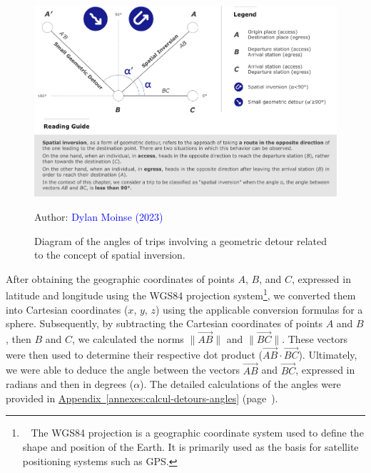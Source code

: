 \begin{refsegment}
\begin{figure}[h!]\vspace*{4pt}
    \caption{Diagram of the angles of trips involving a geometric detour related to the concept of spatial inversion.}
    \label{fig-chap5:inversion-spatiale-detours}
    \centerline{\includegraphics[width=1\columnwidth]{src/Figures/Chap-5/EN_Detours_Calcul_angles.pdf}}
    \vspace{5pt}
    \begin{flushright}\scriptsize{
    Author: \textcolor{blue}{Dylan Moinse (2023)}
    }\end{flushright}
\end{figure}

After obtaining the geographic coordinates of points \(A\), \(B\), and \(C\), expressed in latitude and longitude using the \acrshort{WGS84} projection system\footnote{~
The \acrfull{WGS84} projection is a geographic coordinate system used to define the shape and position of the Earth. It is primarily used as the basis for satellite positioning systems such as \acrfull{GPS}.
}, we converted them into Cartesian coordinates (\(x\), \(y\), \(z\)) using the applicable conversion formulas for a sphere. Subsequently, by subtracting the Cartesian coordinates of points \(A\) and \(B\), then \(B\) and \(C\), we calculated the norms $\lVert \vec{AB} \rVert$ and $\lVert \vec{BC} \rVert$. These vectors were then used to determine their respective dot product ($\vec{AB} \cdot \vec{BC}$). Ultimately, we were able to deduce the angle between the vectors $\vec{AB}$ and $\vec{BC}$, expressed in radians and then in degrees ($\alpha$). The detailed calculations of the angles were provided in \hyperref[annexes:calcul-detours-angles]{Appendix~\ref{annexes:calcul-detours-angles}} (page~\pageref{annexes:calcul-detours-angles}).%


\end{refsegment}
